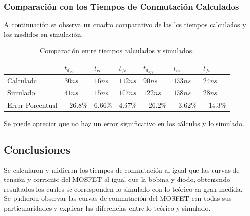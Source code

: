 \subsubsection{Comparación con los Tiempos de Conmutación Calculados}


A continuación se observa un cuadro comparativo de las los tiempos calculados y los medidos en simulación.
\begin{table}[H]
\centering
\begin{tabular}{@{}lllllll@{}}
\toprule
 & $t_{d_{on}}$ & $t_{ri}$ & $t_{fv}$ & $t_{d_{off}}$ & $t_{rv}$ & $t_{fi}$ \\ \midrule
Calculado & $30ns$ & $16ns$ & $112ns$ & $90ns$ & $133ns$ & $24ns$ \\
Simulado & $41ns$ & $15ns$ & $107ns$ & $122ns$ & $138ns$ & $28ns$ \\
Error Porcentual & $-26.8\%$ & $6.66\%$ & $4.67\%$ & $-26.2\%$ & $-3.62\%$ & $-14.3\%$ \\ \bottomrule
\end{tabular}
\caption{Comparación entre tiempos calculados y simulados.}
\end{table}
Se puede apreciar que no hay un error significativo en los cálculos y lo simulado.

\subsection{Conclusiones}
Se calcularon y midieron los tiempos de conmutación al igual que las curvas de tensión y corriente del MOSFET al igual que la bobina y diodo, obteniendo resultados los cuales se corresponden lo simulado con lo teórico en gran medida. Se pudieron observar las curvas de conmutación del MOSFET con todas sus particularidades y explicar las diferencias entre lo teórico y simulado.
%
